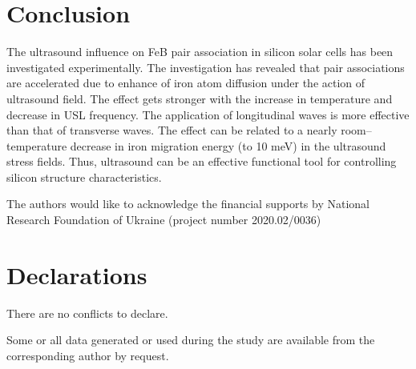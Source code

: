 \documentclass[sn-mathphys]{sn-jnl}%
\theoremstyle{thmstyleone}%
\theoremstyle{thmstyletwo}%
\theoremstyle{thmstylethree}%
\begin{document}
\section{Conclusion}

The ultrasound influence on
FeB pair association in silicon solar cells has been investigated experimentally.
The investigation has revealed that pair associations are accelerated due to enhance of iron
atom diffusion under the action of ultrasound field.
The effect gets stronger with the increase in temperature and decrease in USL frequency.
The application of longitudinal waves is more effective than that of transverse waves.
The effect can be related to a nearly room--temperature decrease in iron migration energy (to 10 meV) in the ultrasound stress ﬁelds.
Thus, ultrasound can be an effective functional tool for controlling silicon structure characteristics.


\backmatter



The authors would like to acknowledge the financial supports by National Research Foundation  of Ukraine
(project number 2020.02/0036)

\section*{Declarations}

There are no conflicts to declare.

Some or all data generated or used during the study are available from the corresponding author by request.

%
%




\end{document}
